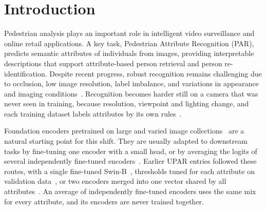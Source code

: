 \documentclass[10pt,twocolumn,letterpaper]{article}
\begin{document}
\section{Introduction}
\label{sec:intro}

Pedestrian analysis plays an important role in intelligent video surveillance and online retail applications. A key task, Pedestrian Attribute Recognition (PAR), predicts semantic attributes of individuals from images, providing interpretable descriptions that support attribute-based person retrieval and person re-identification. Despite recent progress, robust recognition remains challenging due to occlusion, low image resolution, label imbalance, and variations in appearance and imaging conditions~\cite{rap,upar,labelbalanced}. Recognition becomes harder still on a camera that was never seen in training, because resolution, viewpoint and lighting change, and each training dataset labels attributes by its own rules~\cite{upar}.

Foundation encoders pretrained on large and varied image collections~\cite{dinov3,clip} are a natural starting point for this shift. They are usually adapted to downstream tasks by fine-tuning one encoder with a small head, or by averaging the logits of several independently fine-tuned encoders~\cite{deepens}. Earlier UPAR entries followed these routes, with a single fine-tuned Swin-B~\cite{upar23}, thresholds tuned for each attribute on validation data~\cite{upar24}, or two encoders merged into one vector shared by all attributes~\cite{c2tnet}. An average of independently fine-tuned encoders uses the same mix for every attribute, and its encoders are never trained together.
\end{document}
